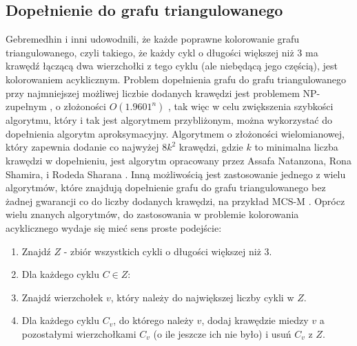 \documentclass{article}
\begin{document}
\subsection{Dopełnienie do grafu triangulowanego}
Gebremedhin i inni udowodnili, że każde poprawne kolorowanie grafu triangulowanego, czyli takiego, że każdy cykl o długości większej niż 3 ma krawędź łączącą dwa wierzchołki z tego cyklu (ale niebędącą jego częścią), jest kolorowaniem acyklicznym. \cite{Gb}
Problem dopełnienia grafu do grafu triangulowanego przy najmniejszej możliwej liczbie dodanych krawędzi jest problemem NP-zupełnym \cite{NPC}, o złożoności $O(1.9601^n)$ \cite{Cmp}, tak więc w celu zwiększenia szybkości algorytmu, który i tak jest algorytmem przybliżonym, można wykorzystać do dopełnienia algorytm aproksymacyjny. Algorytmem o złożoności wielomianowej, który zapewnia dodanie co najwyżej $8k^2$ krawędzi, gdzie $k$ to minimalna liczba krawędzi w dopełnieniu, jest algorytm opracowany przez Assafa Natanzona, Rona Shamira, i Rodeda Sharana \cite{Approx}. Inną możliwością jest zastosowanie jednego z wielu algorytmów, które znajdują dopełnienie grafu do grafu triangulowanego bez żadnej gwarancji co do liczby dodanych krawędzi, na przykład MCS-M \cite{MCS-M}. Oprócz wielu znanych algorytmów, do zastosowania w problemie kolorowania acyklicznego wydaje się mieć sens proste podejście:
\begin{enumerate}
\item Znajdź $Z$ - zbiór wszystkich cykli o długości większej niż 3.
\item Dla każdego cyklu $C \in Z$:
\item Znajdź wierzchołek $v$, który należy do największej liczby cykli w $Z$.
\item Dla każdego cyklu $C_v$, do którego należy $v$, dodaj krawędzie miedzy $v$ a pozostałymi wierzchołkami $C_v$ (o ile jeszcze ich nie było) i usuń $C_v$ z $Z$.
\end{enumerate}
\end{document}
